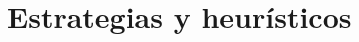 \documentclass[10pt]{beamer}
\begin{document}
\section{Estrategias y heurísticos}

%
\end{document}
